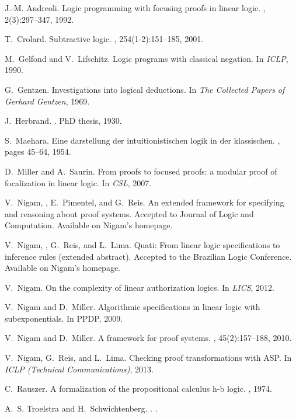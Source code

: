 \documentclass{llncs}
\begin{document}

% 
\begin{thebibliography}{10}

J.-M. Andreoli.
\newblock Logic programming with focusing proofs in linear logic.
, 2(3):297--347, 1992.

T.~Crolard.
\newblock Subtractive logic.
, 254(1-2):151--185, 2001.

M.~Gelfond and V.~Lifschitz.
\newblock Logic programs with classical negation.
\newblock In {\em ICLP}, 1990.

G.~Gentzen.
\newblock Investigations into logical deductions.
\newblock In {\em {The Collected Papers of Gerhard
  Gentzen}}, 1969.

J.~Herbrand.
.
\newblock PhD thesis, 1930.

S.~Maehara.
\newblock Eine darstellung der intuitionistischen logik in der klassischen.
, pages 45--64, 1954.

D.~Miller and A.~Saurin.
\newblock From proofs to focused proofs: a modular proof of focalization in
  linear logic.
\newblock In {\em CSL}, 2007.

V.~Nigam, , E.~Pimentel, and G.~Reis.
\newblock An extended framework for specifying and reasoning about proof
  systems.
\newblock Accepted to Journal of Logic and Computation. Available on Nigam's
  homepage.

V.~Nigam, , G.~Reis, and L.~Lima.
\newblock Quati: From linear logic specifications to inference rules (extended
  abstract).
\newblock Accepted to the Brazilian Logic Conference. Available on Nigam's
  homepage.

V.~Nigam.
\newblock On the complexity of linear authorization logics.
\newblock In {\em LICS}, 2012.

V.~Nigam and D.~Miller.
\newblock Algorithmic specifications in linear logic with subexponentials.
\newblock In PPDP, 2009.

V.~Nigam and D.~Miller.
\newblock A framework for proof systems.
, 45(2):157--188, 2010.

V.~Nigam, G.~Reis, and L.~Lima.
\newblock Checking proof transformations with {ASP}.
\newblock In {\em ICLP (Technical Communications)}, 2013.

C.~Rauszer.
\newblock A formalization of the propositional calculus h-b logic.
, 1974.

A.~S. Troelstra and H.~Schwichtenberg.
.
.

\end{thebibliography}
\end{document}
